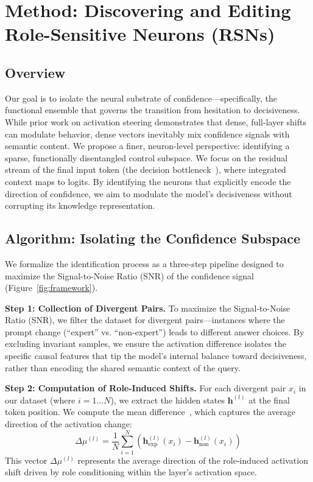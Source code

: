 \documentclass{article}
\begin{document}
\section{Method: Discovering and Editing Role-Sensitive Neurons (RSNs)}
\label{sec:method}

\subsection{Overview} 
Our goal is to isolate the neural substrate of confidence—specifically, the functional ensemble that governs the transition from hesitation to decisiveness. While prior work on activation steering demonstrates that dense, full-layer shifts can modulate behavior, dense vectors inevitably mix confidence signals with semantic content. We propose a finer, neuron-level perspective: identifying a sparse, functionally disentangled control subspace. We focus on the residual stream of the final input token (the decision bottleneck~\cite{gpt2}), where integrated context maps to logits. By identifying the neurons that explicitly encode the direction of confidence, we aim to modulate the model's decisiveness without corrupting its knowledge representation.

\subsection{Algorithm: Isolating the Confidence Subspace} 
We formalize the identification process as a three-step pipeline designed to maximize the Signal-to-Noise Ratio (SNR) of the confidence signal (Figure~\ref{fig:framework}).

\textbf{Step 1: Collection of Divergent Pairs.} 
To maximize the Signal-to-Noise Ratio (SNR), we filter the dataset for divergent pairs—instances where the prompt change (``expert'' vs. ``non-expert'') leads to different answer choices. By excluding invariant samples, we ensure the activation difference isolates the specific causal features that tip the model's internal balance toward decisiveness, rather than encoding the shared semantic context of the query.

\textbf{Step 2: Computation of Role-Induced Shifts.}
For each divergent pair $x_i$ in our dataset (where $i=1 \dots N$), we extract the hidden states $\mathbf{h}^{(l)}$ at the final token position. We compute the mean difference~\cite{10-ntu2024-think}, which captures the average direction of the activation change:
$$\Delta \mu^{(l)} = \frac{1}{N} \sum_{i=1}^{N} \left( \mathbf{h}^{(l)}_{\text{exp}}(x_i) - \mathbf{h}^{(l)}_{\text{non}}(x_i) \right)$$
This vector $\Delta \mu^{(l)}$ represents the average direction of the role-induced activation shift driven by role conditioning within the layer's activation space.
\end{document}
